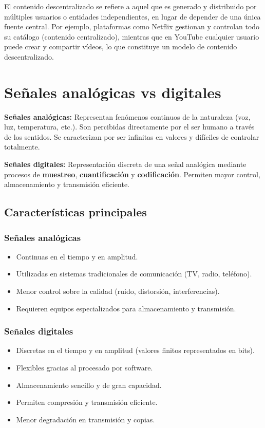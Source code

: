 \documentclass[11pt,a4paper]{article}
\begin{document}
El contenido descentralizado se refiere a aquel que es generado y distribuido por múltiples usuarios o entidades independientes, en lugar de depender de una única fuente central. Por ejemplo, plataformas como Netflix gestionan y controlan todo su catálogo (contenido centralizado), mientras que en YouTube cualquier usuario puede crear y compartir vídeos, lo que constituye un modelo de contenido descentralizado.

\section{Señales analógicas vs digitales}

\begin{DefBox}
\textbf{Señales analógicas:} Representan fenómenos continuos de la naturaleza (voz, luz, temperatura, etc.). Son percibidas directamente por el ser humano a través de los sentidos.
Se caracterizan por ser infinitas en valores y difíciles de controlar totalmente.
\end{DefBox}

\begin{DefBox}
\textbf{Señales digitales:} Representación discreta de una señal analógica mediante procesos de \textbf{muestreo}, \textbf{cuantificación} y \textbf{codificación}.
Permiten mayor control, almacenamiento y transmisión eficiente.
\end{DefBox}

\subsection{Características principales}

\subsubsection*{Señales analógicas}
\begin{itemize}
  \item Continuas en el tiempo y en amplitud.
  \item Utilizadas en sistemas tradicionales de comunicación (TV, radio, teléfono).
  \item Menor control sobre la calidad (ruido, distorsión, interferencias).
  \item Requieren equipos especializados para almacenamiento y transmisión.
\end{itemize}

\subsubsection*{Señales digitales}
\begin{itemize}
  \item Discretas en el tiempo y en amplitud (valores finitos representados en bits).
  \item Flexibles gracias al procesado por software.
  \item Almacenamiento sencillo y de gran capacidad.
  \item Permiten compresión y transmisión eficiente.
  \item Menor degradación en transmisión y copias.
\end{itemize}
\end{document}

